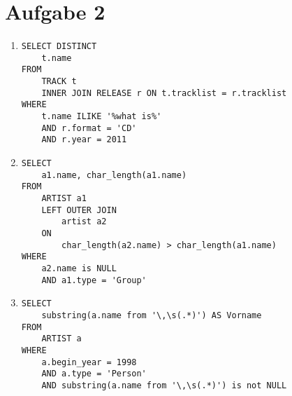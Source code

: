 \documentclass{article}
\begin{document}
    \section*{Aufgabe 2}
    \begin{enumerate}
        \item
            \begin{verbatim}
SELECT DISTINCT
    t.name
FROM
    TRACK t
    INNER JOIN RELEASE r ON t.tracklist = r.tracklist
WHERE
    t.name ILIKE '%what is%'
    AND r.format = 'CD'
    AND r.year = 2011
            \end{verbatim}
        \item
            \begin{verbatim}
SELECT
    a1.name, char_length(a1.name)
FROM
    ARTIST a1
    LEFT OUTER JOIN
        artist a2
    ON
        char_length(a2.name) > char_length(a1.name)
WHERE
    a2.name is NULL
    AND a1.type = 'Group'
            \end{verbatim}
        \item
            \begin{verbatim}
SELECT
    substring(a.name from '\,\s(.*)') AS Vorname
FROM
    ARTIST a
WHERE
    a.begin_year = 1998
    AND a.type = 'Person'
    AND substring(a.name from '\,\s(.*)') is not NULL
            \end{verbatim}
    \end{enumerate}
\end{document}

